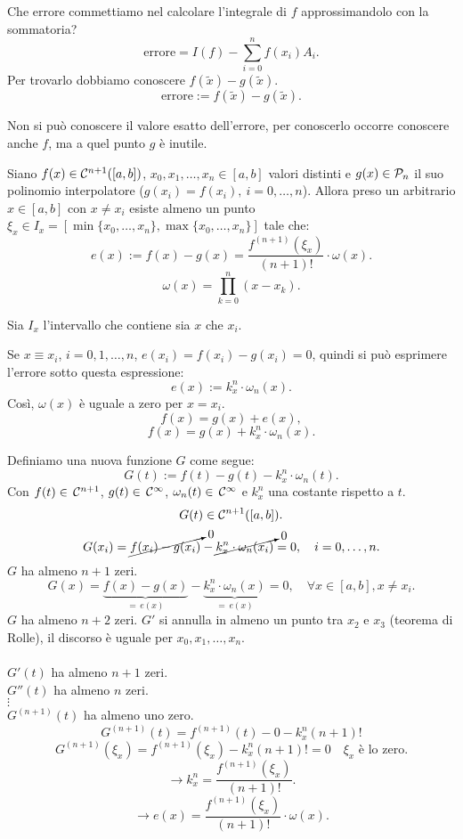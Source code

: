 Che errore commettiamo nel calcolare l'integrale di $f$ approssimandolo con
la sommatoria?
\[\textrm{errore} = I(f) -\sum_{i = 0}^nf(x_i)A_i.\]
Per trovarlo dobbiamo conoscere $f(\tilde{x}) - g(\tilde{x})$.
\[\textrm{errore} := f(\tilde{x}) - g(\tilde{x}).\]

Non si può conoscere il valore esatto dell'errore, per conoscerlo occorre
conoscere anche $f$, ma a quel punto $g$ è inutile.

\begin{teo}\label{teo7.11}
Siano $f(x) \in \mathcal{C}^{n+1}([a,b])$, $x_0, x_1, \ldots, x_n \in [a,b]$ valori
distinti e $g(x) \in \mathcal{P}_n$ il suo polinomio interpolatore ($g(x_i) = f(x_i),
\ i = 0, \ldots, n$). Allora preso un arbitrario $x \in [a,b]$ con $x \neq
x_i$ esiste almeno un punto $\xi_x \in I_x = [\min\{x_0, \ldots, x_n\},
\max\{x_0, \ldots, x_n\}]$ tale che:
\[e(x) := f(x)-g(x) = \frac{f^{(n+1)}(\xi_x)}{(n+1)!} \cdot \omega(x).\]
\[\omega(x) = \prod_{k = 0}^n(x-x_k).\]
\end{teo}

\begin{dimo}
Sia $I_x$ l'intervallo che  contiene sia $x$ che $x_i$.

Se $x \equiv x_i$, $i = 0, 1, \ldots, n$, $e(x_i) = f(x_i)-g(x_i) = 0$, quindi
si può esprimere l'errore sotto questa espressione:
\[e(x) := k_x^n \cdot \omega_n(x).\]
Così, $\omega(x)$ è uguale a zero per $x = x_i$.
\[f(x) = g(x) + e(x),\]
\[f(x) = g(x) + k_x^n \cdot \omega_n(x).\]

Definiamo una nuova funzione $G$ come segue:
\[G(t) := f(t)- g(t) - k_x^n \cdot \omega_n(t).\]
Con $f(t) \in\, \mathcal{C}^{n+1}$, $ g(t) \in\, \mathcal{C}^{\infty}$, $\omega_n(t)\in\,
\mathcal{C}^{\infty}$ e $k_x^n$ una costante rispetto a $t$.
\[G(t) \in \mathcal{C}^{n+1}([a,b]).\]
\[G(x_i) = \cancelto{0}{f(x_i)- g(x_i)} -
\cancelto{0}{k_x^n\cdot\omega_n(x_i)} = 0, \quad i= 0,\ldots,n.
\]
$G$ ha almeno $n+1$ zeri.
\[G(x) = \underbrace{f(x)- g(x)}_{=\, e(x)} -
\underbrace{k_x^n\cdot\omega_n(x)}_{=\, e(x)} = 0, \quad \forall x \in[a,b],
x \neq x_i.\]
$G$ ha almeno $n+2$ zeri. $G'$ si annulla in almeno un punto tra $x_2$ e
$x_3$ (teorema di Rolle), il discorso è uguale per $x_0, x_1, \ldots, x_n$.\\
\\$G'(t)$ ha almeno $n+1$ zeri.\\
$G''(t)$ ha almeno $n$ zeri.\\
$\vdots$\\
$G^{(n+1)}(t)$ ha almeno uno zero.\\
\[G^{(n+1)}(t) = f^{(n+1)}(t) - 0 - k_x^n(n+1)!\]
\[G^{(n+1)}(\xi_x) = f^{(n+1)}(\xi_x)- k_x^n(n+1)! = 0 \quad \xi_x
\textrm{ è lo zero.}\]
\[\longrightarrow k_x^n = \frac{f^{(n+1)}(\xi_x)}{(n+1)!}.\]
\[\longrightarrow e(x) = \frac{f^{(n+1)}(\xi_x)}{(n+1)!} \cdot \omega(x).\]
\end{dimo}


